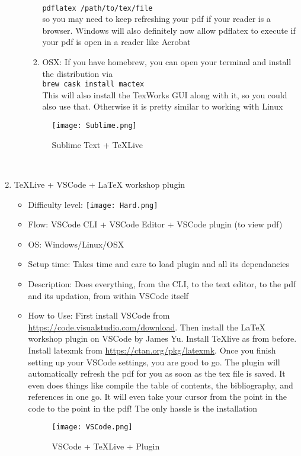 \documentclass[12pt, letterpaper]{article}
\theoremstyle{remark}
\begin{document}
\begin{enumerate}
\begin{itemize}
\begin{enumerate}
                    \\ \lstinline[language=bash]{pdflatex /path/to/tex/file} \\
                    so you may need to keep refreshing your pdf if your reader is a browser. Windows will also definitely now allow pdflatex to execute if your pdf is open in a reader like Acrobat
                    \item OSX: If you have homebrew, you can open your terminal and install the distribution via \\
                    \lstinline[language=bash]{brew cask install mactex} \\
                    This will also install the TexWorks GUI along with it, so you could also use that. Otherwise it is pretty similar to working with Linux
                \end{enumerate}
            \begin{figure}[h]
                \centering
                \texttt{[image: Sublime.png]}
                \caption{Sublime Text + TeXLive}
                \label{fig:Sublime}
            \end{figure}
        \end{itemize}
        ~
        \newline
        \item TeXLive + VSCode + \LaTeX{} workshop plugin
        \begin{itemize}
            \item Difficulty level: \texttt{[image: Hard.png]}
            \item Flow: VSCode CLI + VSCode Editor + VSCode plugin (to view pdf)
            \item OS: Windows/Linux/OSX
            \item Setup time: Takes time and care to load plugin and all its dependancies
            \item Description: Does everything, from the CLI, to the text editor, to the pdf and its updation, from within VSCode itself
            \item How to Use: First install VSCode from \url{https://code.visualstudio.com/download}. Then install the \LaTeX{} workshop plugin on VSCode by James Yu. Install TeXlive as from before. Install latexmk from \url{https://ctan.org/pkg/latexmk}. Once you finish setting up your VSCode settings, you are good to go. The plugin will automatically refresh the pdf for you as soon as the tex file is saved. It even does things like compile the table of contents, the bibliography, and references in one go. It will even take your cursor from the point in the code to the point in the pdf! The only hassle is the installation
            \begin{figure}[h]
                \centering
                \texttt{[image: VSCode.png]}
                \caption{VSCode + TeXLive + Plugin}
                \label{fig:VSCode}
            \end{figure}
        \end{itemize}
        

\end{enumerate}
\end{document}
